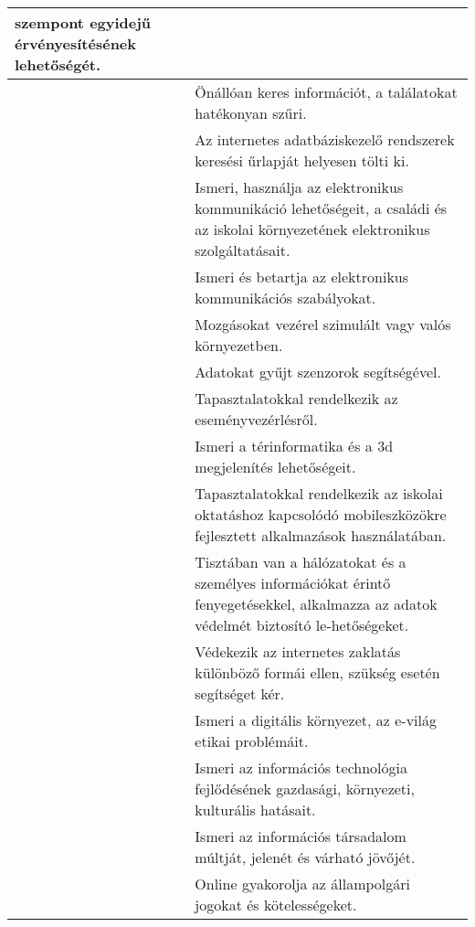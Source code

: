 \begin{longtable}[]{p{\evflength}@{\strut}>{\begin{minipage}{\columnlength}\strut}l<{\strut\end{minipage}}}
  szempont egyidejű érvényesítésének lehetőségét.
\tabularnewline
\hline
&
  Önállóan keres információt, a találatokat hatékonyan szűri.
\tabularnewline
\hline
&
  Az internetes adatbáziskezelő rendszerek keresési űrlapját helyesen
  tölti ki.
\tabularnewline
\hline
&
  Ismeri, használja az elektronikus kommunikáció lehetőségeit, a családi
  és az iskolai környezetének elektronikus szolgáltatásait.
\tabularnewline
\hline
&
  Ismeri és betartja az elektronikus kommunikációs szabályokat.
\tabularnewline
\hline
&
  Mozgásokat vezérel szimulált vagy valós környezetben.
\tabularnewline
\hline
&
  Adatokat gyűjt szenzorok segítségével.
\tabularnewline
\hline
&
  Tapasztalatokkal rendelkezik az eseményvezérlésről.
\tabularnewline
\hline
&
  Ismeri a térinformatika és a 3d megjelenítés lehetőségeit.
\tabularnewline
\hline
&
  Tapasztalatokkal rendelkezik az iskolai oktatáshoz kapcsolódó
  mobileszközökre fejlesztett alkalmazások használatában.
\tabularnewline
\hline
&
  Tisztában van a hálózatokat és a személyes információkat érintő
  fenyegetésekkel, alkalmazza az adatok védelmét biztosító
  le-\break hetőségeket.
\tabularnewline
\hline
&
  Védekezik az internetes zaklatás különböző formái ellen, szükség
  esetén segítséget kér.
\tabularnewline
\hline
&
  Ismeri a digitális környezet, az e-világ etikai problémáit.
\tabularnewline
\hline
&
  Ismeri az információs technológia fejlődésének gazdasági, környezeti,
  kulturális hatásait.
\tabularnewline
\hline
&
  Ismeri az információs társadalom múltját, jelenét és várható jövőjét.
\tabularnewline
\hline
&
  Online gyakorolja az állampolgári jogokat és kötelességeket.
\tabularnewline
\hline
\end{longtable}


\settowidth{\evflength}{\usebox{\evfbox}}
\setlength{\columnlength}{\textwidth}
\addtolength{\columnlength}{-\evflength}

